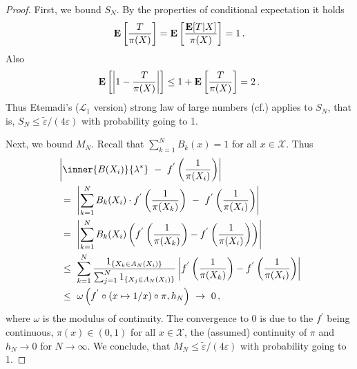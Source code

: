 \begin{proof}
First, we bound $S_N$.
By the properties of conditional expectation it holds
\begin{gather*}
  \mathbf{E}
  \left[ 
    \frac{T}{\pi(X)}
  \right]
  =
  \mathbf{E}
  \left[ 
    \frac{\mathbf{E}[T|X]}{\pi(X)}
  \right]
  =1
  \,.
\end{gather*}
Also
\begin{gather}
  \mathbf{E}
  \left[ 
    \left| 
    1
    -
    \frac{T}{\pi(X)}
    \right|
  \right]
  \le
  1
  +
  \mathbf{E}
  \left[ 
    \frac{T}{\pi(X)}
  \right]
  =
  2
  \,.
\end{gather}
Thus Etemadi's ($\mathcal{L}_1$ version) strong law of large numbers (cf.\cite[Theorem~5.17]{Klenke2020}) applies
to $S_N$, that is,
$S_N \le 
\tilde{\varepsilon}
/
(4\varepsilon)
$
with probability going to 1.

Next, we bound $M_N$.
Recall that $\sum_{k=1}^{N}B_k(x)=1$ for all $x\in\mathcal{X}$. Thus
\begin{align}
  \label{part_trick}
  \begin{split}
  &
\left| 
        \inner
       {B(X_i)}
       {\lambda^*}
       \ 
        -
        \ 
        f^{'}
        \left( 
          \frac{1}{\pi(X_i)}
     \right)
\right|
      \\
      &
      \ 
      =
      \ 
      \left| 
      \sum_{k=1}^{N} 
      B_k(X_i)
      \cdot
        f^{'}
        \left( 
          \frac{1}{\pi(X_k)}
          \right)
      \ 
      -
      \ 
        f^{'}
        \left( 
          \frac{1}{\pi(X_i)}
     \right)
      \right|
      \\
      &
      \ 
      =
      \ 
      \left| 
      \sum_{k=1}^{N} 
      B_k(X_i)
      \left( 
        f^{'}
        \left( 
          \frac{1}{\pi(X_k)}
     \right)
     -
        f^{'}
        \left( 
          \frac{1}{\pi(X_i)}
     \right)
      \right)
      \right|
      \\
      &
      \ 
      \le
      \ 
      \sum_{k=1}^{N} 
      \frac{1_{\left\{ X_k\in A_N(X_i) \right\}}}
      {
        \sum_{j=1}^{N} 
1_{\left\{ X_j\in A_N(X_i) \right\}}
      }
      \left| 
        f^{'}
        \left( 
          \frac{1}{\pi(X_k)}
     \right)
     -
        f^{'}
        \left( 
          \frac{1}{\pi(X_i)}
     \right)
      \right|
      \\
      &
      \ 
      \le
      \ 
      \omega
      \left( f^{'}\circ (x\mapsto1/x)\circ \pi,h_N \right)
      \ 
      \to
      \ 
      0
      \,,
\end{split}
\end{align}
where $\omega$ is the modulus of continuity.
The convergence to 0 is due to the $f^{'}$ being continuous, $\pi(x)\in(0,1)$ for all $x\in\mathcal{X}$, the (assumed) continuity of $\pi$ and $h_N\to 0$ for $N\to\infty$.
We conclude, that $
M_N\le
\tilde{\varepsilon}
/
(4\varepsilon)
$
with probability going to 1.


\end{proof}
